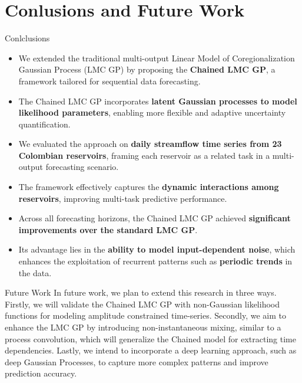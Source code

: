 \section{Conlusions and Future Work}

\begin{frame}{Conlclusions}
	\begin{itemize}
		\item We extended the traditional multi-output Linear Model of Coregionalization Gaussian Process (LMC GP) by proposing the \textbf{Chained LMC GP}, a framework tailored for sequential data forecasting. 
		\item The Chained LMC GP incorporates \textbf{latent Gaussian processes to model likelihood parameters}, enabling more flexible and adaptive uncertainty quantification. 
		\item We evaluated the approach on \textbf{daily streamflow time series from 23 Colombian reservoirs}, framing each reservoir as a related task in a multi-output forecasting scenario. 
		\item The framework effectively captures the \textbf{dynamic interactions among reservoirs}, improving multi-task predictive performance. 
		\item Across all forecasting horizons, the Chained LMC GP achieved \textbf{significant improvements over the standard LMC GP}. 
		\item Its advantage lies in the \textbf{ability to model input-dependent noise}, which enhances the exploitation of recurrent patterns such as \textbf{periodic trends} in the data. 
	\end{itemize}
\end{frame}

\begin{frame}{Future Work}
	In future work, we plan to extend this research in three ways. Firstly, we will validate the Chained LMC GP with non-Gaussian likelihood functions for modeling amplitude constrained time-series. Secondly, we aim to enhance the LMC GP by introducing non-instantaneous mixing, similar to a process convolution, which will generalize the Chained model for extracting time dependencies. Lastly, we intend to incorporate a deep learning approach, such as deep Gaussian Processes, to capture more complex patterns and improve prediction accuracy. 
\end{frame}